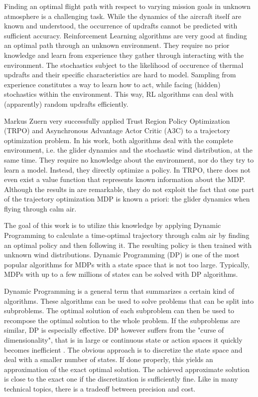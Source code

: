 Finding an optimal flight path with respect to varying mission goals in unknown atmosphere is a challenging task. While the dynamics of the aircraft itself are known and understood, the occurrence of updrafts cannot be predicted with sufficient accuracy. Reinforcement Learning algorithms are very good at finding an optimal path through an unknown environment. They require no prior knowledge and learn from experience they gather through interacting with the environment. The stochastics subject to the likelihood of occurence of thermal updrafts and their specific characteristics are hard to model. Sampling from experience constitutes a way to learn how to act, while facing (hidden) stochastics within the environment. This way, RL algorithms can deal with (apparently) random updrafts efficiently.

Markus Zuern very successfully applied Trust Region Policy Optimization (TRPO) and Asynchronous Advantage Actor Critic (A3C) to a trajectory optimization problem\cite{Zuern2017}. In his work, both algorithms deal with the complete environment, i.e. the glider dynamics and the stochastic wind distribution, at the same time. They require no knowledge about the environment, nor do they try to learn a model. Instead, they directly optimize a policy. In TRPO, there does not even exist a value function that represents known information about the MDP. Although the results in \cite{Zuern2017} are remarkable, they do not exploit the fact that one part of the trajectory optimization MDP is known a priori: the glider dynamics when flying through calm air.

The goal of this work is to utilize this knowledge by applying Dynamic Programming to calculate a time-optimal trajectory through calm air by finding an optimal policy and then following it. The resulting policy is then trained with unknown wind distributions. Dynamic Programming (DP) is one of the most popular algorithms for MDPs with a state space that is not too large. Typically, MDPs with up to a few millions of states can be solved with DP algorithms.

Dynamic Programming is a general term that summarizes a certain kind of algorithms. These algorithms can be used to solve problems that can be split into subproblems. The optimal solution of each subproblem can then be used to recompose the optimal solution to the whole problem. If the subproblems are similar, DP is especially effective. DP however suffers from the "curse of dimensionality", that is in large or continuous state or action spaces it quickly becomes inefficient \cite{Powell2007ADP}. The obvious approach is to discretize the state space and deal with a smaller number of states. If done properly, this yields an approximation of the exact optimal solution. The achieved approximate solution is close to the exact one if the discretization is sufficiently fine. Like in many technical topics, there is a tradeoff between precision and cost.

